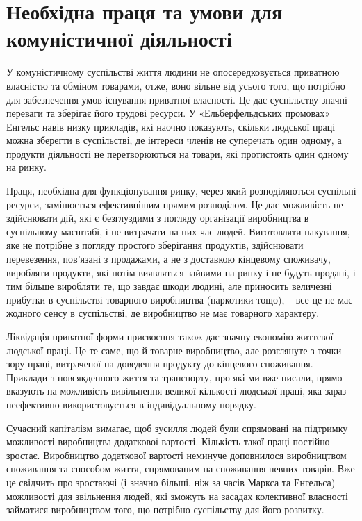 \documentclass[12pt,a4paper,openany]{book}
\begin{document}
\section{Необхідна праця та умови для комуністичної діяльності}
\label{sec:06_necessitatem_truda}

У комуністичному суспільстві життя людини не опосередковується приватною власністю та обміном товарами, отже, воно вільне від усього того, що потрібно для забезпечення умов існування приватної власності. Це дає суспільству значні переваги та зберігає його трудові ресурси. У «Ельберфельдських промовах» Енгельс навів низку прикладів, які наочно показують, скільки людської праці можна зберегти в суспільстві, де інтереси членів не суперечать один одному, а продукти діяльності не перетворюються на товари, які протистоять один одному на ринку.

Праця, необхідна для функціонування ринку, через який розподіляються суспільні ресурси, замінюється ефективнішим прямим розподілом. Це дає можливість не здійснювати дій, які є безглуздими з погляду організації виробництва в суспільному масштабі, і не витрачати на них час людей. Виготовляти пакування, яке не потрібне з погляду простого зберігання продуктів, здійснювати перевезення, пов’язані з продажами, а не з доставкою кінцевому споживачу, виробляти продукти, які потім виявляться зайвими на ринку і не будуть продані, і тим більше виробляти те, що завдає шкоди людині, але приносить величезні прибутки в суспільстві товарного виробництва (наркотики тощо), – все це не має жодного сенсу в суспільстві, де виробництво не має товарного характеру.

Ліквідація приватної форми присвоєння також дає значну економію життєвої людської праці. Це те саме, що й товарне виробництво, але розглянуте з точки зору праці, витраченої на доведення продукту до кінцевого споживання. Приклади з повсякденного життя та транспорту, про які ми вже писали, прямо вказують на можливість вивільнення великої кількості людської праці, яка зараз неефективно використовується в індивідуальному порядку.

Сучасний капіталізм вимагає, щоб зусилля людей були спрямовані на підтримку можливості виробництва додаткової вартості. Кількість такої праці постійно зростає. Виробництво додаткової вартості неминуче доповнилося виробництвом споживання та способом життя, спрямованим на споживання певних товарів. Вже це свідчить про зростаючі (і значно більші, ніж за часів Маркса та Енгельса) можливості для звільнення людей, які зможуть на засадах колективної власності займатися виробництвом того, що потрібно суспільству для його розвитку.
\end{document}
